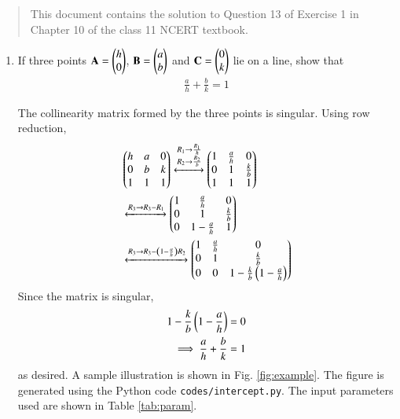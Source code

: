 \documentclass[journal,12pt,twocolumn]{IEEEtran}
\begin{document}
\begin{abstract}
    This document contains the solution to Question 13 of Exercise 1 in Chapter
    10 of the class 11 NCERT textbook.
\end{abstract}

\begin{enumerate}
    \item If three points $\mathbf{A} = \begin{pmatrix}h\\0\end{pmatrix}$, $\mathbf{B} = \begin{pmatrix}a\\b\end{pmatrix}$ 
    and $\mathbf{C} = \begin{pmatrix}0\\k\end{pmatrix}$ lie on a line, show that
    \begin{align}
        \frac{a}{h} + \frac{b}{k} = 1
        \label{eq:line-intercept}
    \end{align}

    \solution The collinearity matrix formed by the three points is singular.
    Using row reduction,
    \begin{align}
        &\begin{pmatrix}h&a&0\\0&b&k\\1&1&1\end{pmatrix} \xleftrightarrow[]
        {\substack{R_1\rightarrow\frac{R_1}{h}\\R_2\rightarrow\frac{R_2}{b}}}
        \begin{pmatrix}1&\frac{a}{h}&0\\0&1&\frac{k}{b}\\1&1&1\end{pmatrix} \\
        &\xleftrightarrow[]{R_3\rightarrow R_3-R_1}
        \begin{pmatrix}1&\frac{a}{h}&0\\0&1&\frac{k}{b}\\0&1-\frac{a}{h}&1\end{pmatrix} \\
        &\xleftrightarrow[]{R_3\rightarrow R_3-\ensuremath{\left(1-\frac{a}{h}\right)}R_2}
        \begin{pmatrix}1&\frac{a}{h}&0\\0&1&\frac{k}{b}\\0&0&1 - \frac{k}{b}\left(1-\frac{a}{h}\right)\end{pmatrix}
        \label{eq:row-red}
    \end{align}
    Since the matrix is singular,
    \begin{align}
        1 - \frac{k}{b}\left(1-\frac{a}{h}\right) = 0 \\
        \implies \frac{a}{h} + \frac{b}{k} = 1
        \label{eq:proof}
    \end{align}
    as desired. A sample illustration is shown in Fig. \ref{fig:example}. The 
    figure is generated using the Python code \texttt{codes/intercept.py}. The
    input parameters used are shown in Table \ref{tab:param}.
    \begin{table}[!ht]

\end{table}
\end{enumerate}
\end{document}
